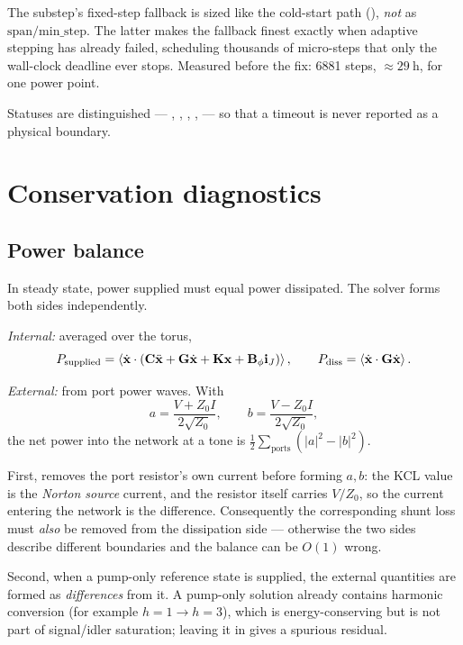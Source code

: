 \begin{implnote}
The substep's fixed-step fallback is sized like the cold-start path
(), \emph{not} as
$\text{span}/\text{min\_step}$. The latter makes the fallback finest exactly
when adaptive stepping has already failed, scheduling thousands of micro-steps
that only the wall-clock deadline ever stops. Measured before the fix: 6881
steps, $\approx\SI{29}{\hour}$, for one power point.
\end{implnote}

Statuses are distinguished --- ,
, ,
,  --- so that a timeout is never reported
as a physical boundary.

\section{Conservation diagnostics}

\subsection{Power balance}
\label{sec:power-balance}

In steady state, power supplied must equal power dissipated. The solver forms
both sides independently.

\emph{Internal:} averaged over the torus,
\begin{equation}
  P_{\mathrm{supplied}} = \left\langle \dot{\mathbf{x}}\cdot
    \left(\mathbf{C}\ddot{\mathbf{x}} + \mathbf{G}\dot{\mathbf{x}} + \mathbf{K}\mathbf{x}
          + \mathbf{B}_{\phi}\mathbf{i}_{J}\right)\right\rangle,
  \qquad
  P_{\mathrm{diss}} = \left\langle\dot{\mathbf{x}}\cdot\mathbf{G}\dot{\mathbf{x}}\right\rangle.
\end{equation}

\emph{External:} from port power waves. With
\begin{equation}
  a = \frac{V + Z_0 I}{2\sqrt{Z_0}},\qquad
  b = \frac{V - Z_0 I}{2\sqrt{Z_0}},
\end{equation}
the net power into the network at a tone is
$\tfrac12\sum_{\text{ports}}(|a|^{2}-|b|^{2})$.

\begin{implnote}
First,  removes the port resistor's own current
before forming $a,b$: the KCL value is the \emph{Norton source} current, and the
resistor itself carries $V/Z_0$, so the current entering the network is the
difference. Consequently the corresponding shunt loss must \emph{also} be
removed from the dissipation side --- otherwise the two sides describe different
boundaries and the balance can be $O(1)$ wrong.

Second, when a pump-only reference state is supplied, the external quantities
are formed as \emph{differences} from it. A pump-only solution already contains
harmonic conversion (for example $h{=}1 \to h{=}3$), which is energy-conserving
but is not part of signal/idler saturation; leaving it in gives a spurious
residual.
\end{implnote}

